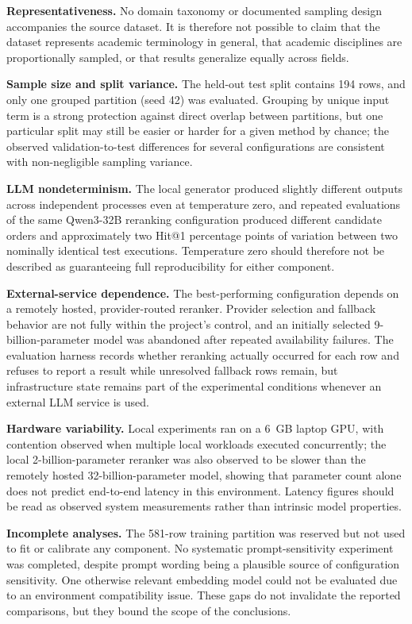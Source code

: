 \textbf{Representativeness.} No domain taxonomy or documented sampling design accompanies the source dataset. It is therefore not possible to claim that the dataset represents academic terminology in general, that academic disciplines are proportionally sampled, or that results generalize equally across fields.

\textbf{Sample size and split variance.} The held-out test split contains 194 rows, and only one grouped partition (seed 42) was evaluated. Grouping by unique input term is a strong protection against direct overlap between partitions, but one particular split may still be easier or harder for a given method by chance; the observed validation-to-test differences for several configurations are consistent with non-negligible sampling variance.

\textbf{LLM nondeterminism.} The local generator produced slightly different outputs across independent processes even at temperature zero, and repeated evaluations of the same Qwen3-32B reranking configuration produced different candidate orders and approximately two Hit@1 percentage points of variation between two nominally identical test executions. Temperature zero should therefore not be described as guaranteeing full reproducibility for either component.

\textbf{External-service dependence.} The best-performing configuration depends on a remotely hosted, provider-routed reranker. Provider selection and fallback behavior are not fully within the project's control, and an initially selected 9-billion-parameter model was abandoned after repeated availability failures. The evaluation harness records whether reranking actually occurred for each row and refuses to report a result while unresolved fallback rows remain, but infrastructure state remains part of the experimental conditions whenever an external LLM service is used.

\textbf{Hardware variability.} Local experiments ran on a 6~GB laptop GPU, with contention observed when multiple local workloads executed concurrently; the local 2-billion-parameter reranker was also observed to be slower than the remotely hosted 32-billion-parameter model, showing that parameter count alone does not predict end-to-end latency in this environment. Latency figures should be read as observed system measurements rather than intrinsic model properties.

\textbf{Incomplete analyses.} The 581-row training partition was reserved but not used to fit or calibrate any component. No systematic prompt-sensitivity experiment was completed, despite prompt wording being a plausible source of configuration sensitivity. One otherwise relevant embedding model could not be evaluated due to an environment compatibility issue. These gaps do not invalidate the reported comparisons, but they bound the scope of the conclusions.

